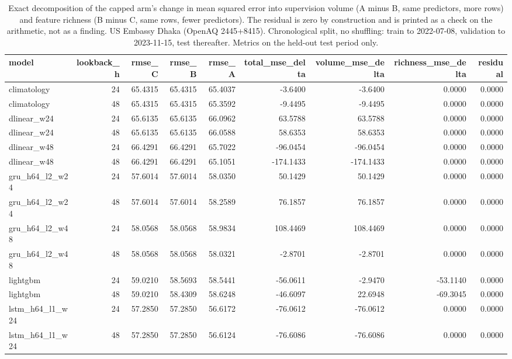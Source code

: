 \begin{table}[htbp]
\caption{Exact decomposition of the capped arm's change in mean squared error into supervision volume (A minus B, same predictors, more rows) and feature richness (B minus C, same rows, fewer predictors). The residual is zero by construction and is printed as a check on the arithmetic, not as a finding. US Embassy Dhaka (OpenAQ 2445+8415). Chronological split, no shuffling: train to 2022-07-08, validation to 2023-11-15, test thereafter. Metrics on the held-out test period only.}
\label{tab:lookback_decomposition}
\begin{tabular}{lrrrrrrrr}
\toprule
model & lookback\_h & rmse\_C & rmse\_B & rmse\_A & total\_mse\_delta & volume\_mse\_delta & richness\_mse\_delta & residual \\
\midrule
climatology & 24 & 65.4315 & 65.4315 & 65.4037 & -3.6400 & -3.6400 & 0.0000 & 0.0000 \\
climatology & 48 & 65.4315 & 65.4315 & 65.3592 & -9.4495 & -9.4495 & 0.0000 & 0.0000 \\
dlinear\_w24 & 24 & 65.6135 & 65.6135 & 66.0962 & 63.5788 & 63.5788 & 0.0000 & 0.0000 \\
dlinear\_w24 & 48 & 65.6135 & 65.6135 & 66.0588 & 58.6353 & 58.6353 & 0.0000 & 0.0000 \\
dlinear\_w48 & 24 & 66.4291 & 66.4291 & 65.7022 & -96.0454 & -96.0454 & 0.0000 & 0.0000 \\
dlinear\_w48 & 48 & 66.4291 & 66.4291 & 65.1051 & -174.1433 & -174.1433 & 0.0000 & 0.0000 \\
gru\_h64\_l2\_w24 & 24 & 57.6014 & 57.6014 & 58.0350 & 50.1429 & 50.1429 & 0.0000 & 0.0000 \\
gru\_h64\_l2\_w24 & 48 & 57.6014 & 57.6014 & 58.2589 & 76.1857 & 76.1857 & 0.0000 & 0.0000 \\
gru\_h64\_l2\_w48 & 24 & 58.0568 & 58.0568 & 58.9834 & 108.4469 & 108.4469 & 0.0000 & 0.0000 \\
gru\_h64\_l2\_w48 & 48 & 58.0568 & 58.0568 & 58.0321 & -2.8701 & -2.8701 & 0.0000 & 0.0000 \\
lightgbm & 24 & 59.0210 & 58.5693 & 58.5441 & -56.0611 & -2.9470 & -53.1140 & 0.0000 \\
lightgbm & 48 & 59.0210 & 58.4309 & 58.6248 & -46.6097 & 22.6948 & -69.3045 & 0.0000 \\
lstm\_h64\_l1\_w24 & 24 & 57.2850 & 57.2850 & 56.6172 & -76.0612 & -76.0612 & 0.0000 & 0.0000 \\
lstm\_h64\_l1\_w24 & 48 & 57.2850 & 57.2850 & 56.6124 & -76.6086 & -76.6086 & 0.0000 & 0.0000 \\

\end{tabular}
\end{table}
